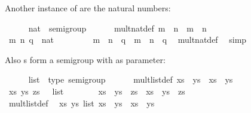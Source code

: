 \begin{isabellebody}
\begin{isamarkuptext}
  \medskip Another instance of  are the natural numbers:%
\end{isamarkuptext}%
\isamarkuptrue%
\ \ \ \ \isamarkupfalse%
\ nat\ {\isacharcolon}{\isacharcolon}\ semigroup\isanewline
\ \ \ \ \ \ mult{\isacharunderscore}nat{\isacharunderscore}def{\isacharcolon}\ {\isachardoublequoteopen}m\ {\isasymotimes}\ n\ {\isasymequiv}\ m\ {\isacharplus}\ n{\isachardoublequoteclose}\isanewline
%
\isadelimproof
\ \ \ \ %
\endisadelimproof
%
\isatagproof
{}\isamarkupfalse%
\isanewline
\ \ \ \ \ \ \isamarkupfalse%
\ m\ n\ q\ {\isacharcolon}{\isacharcolon}\ nat\ \isanewline
\ \ \ \ \ \ \isamarkupfalse%
\ {\isachardoublequoteopen}m\ {\isasymotimes}\ n\ {\isasymotimes}\ q\ {\isacharequal}\ m\ {\isasymotimes}\ {\isacharparenleft}n\ {\isasymotimes}\ q{\isacharparenright}{\isachardoublequoteclose}\ \isamarkupfalse%
\ mult{\isacharunderscore}nat{\isacharunderscore}def\ \isamarkupfalse%
\ simp\isanewline
\ \ \ \ \isamarkupfalse%
%
\endisatagproof
{\isafoldproof}%
%
\isadelimproof
%
\endisadelimproof
%
\begin{isamarkuptext}%
\noindent Also s form a semigroup with  as
  parameter:%
\end{isamarkuptext}%
\isamarkuptrue%
\ \ \ \ \isamarkupfalse%
\ list\ {\isacharcolon}{\isacharcolon}\ {\isacharparenleft}type{\isacharparenright}\ semigroup\isanewline
\ \ \ \ \ \ mult{\isacharunderscore}list{\isacharunderscore}def{\isacharcolon}\ {\isachardoublequoteopen}xs\ {\isasymotimes}\ ys\ {\isasymequiv}\ xs\ {\isacharat}\ ys{\isachardoublequoteclose}\isanewline
%
\isadelimproof
\ \ \ \ %
\endisadelimproof
%
\isatagproof
{}\isamarkupfalse%
\isanewline
\ \ \ \ \ \ \isamarkupfalse%
\ xs\ ys\ zs\ {\isacharcolon}{\isacharcolon}\ {\isachardoublequoteopen}{\isasymalpha}\ list{\isachardoublequoteclose}\isanewline
\ \ \ \ \ \ \isamarkupfalse%
\ {\isachardoublequoteopen}xs\ {\isasymotimes}\ ys\ {\isasymotimes}\ zs\ {\isacharequal}\ xs\ {\isasymotimes}\ {\isacharparenleft}ys\ {\isasymotimes}\ zs{\isacharparenright}{\isachardoublequoteclose}\isanewline
\ \ \ \ \ \ \isamarkupfalse%
\ {\isacharminus}\isanewline
\ \ \ \ \ \ \ \ \isamarkupfalse%
\ mult{\isacharunderscore}list{\isacharunderscore}def\ \isamarkupfalse%
\ {\isachardoublequoteopen}{\isasymAnd}xs\ ys{\isasymColon}{\isasymalpha}\ list{\isachardot}\ xs\ {\isasymotimes}\ ys\ {\isasymequiv}\ xs\ {\isacharat}\ ys{\isachardoublequoteclose}\ \isacommand{{\isachardot}}\isamarkupfalse%

\end{isabellebody}
